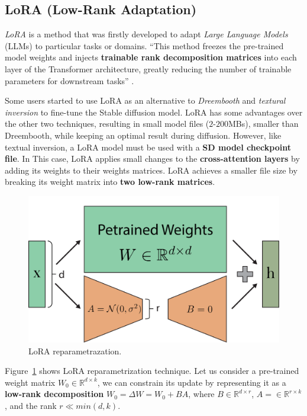\documentclass[preprint]{elsarticle}
\begin{document}
\subsection{LoRA (Low-Rank Adaptation)}

\emph{LoRA} \cite{hu2021lora} is a method that was firstly developed to adapt 
\emph{Large Language Models} (LLMs) to particular tasks or domains.
``This method freezes  the pre-trained model weights and injects \textbf{trainable rank decomposition matrices}  into each layer of the Transformer architecture, greatly reducing the number of trainable 
parameters for downstream tasks'' \cite{hu2021lora}.

Some users started to use LoRA as an alternative to \emph{Dreembooth} \cite{ruiz2022dreambooth} and \emph{textural inversion} \cite{gal2022image} to  fine-tune the Stable diffusion model. LoRA has some advantages over the other two techniques, resulting in small model files ($2$-$200$MBs), smaller than Dreembooth,  while keeping an optimal result during diffusion. However, like textual inversion, a LoRA model must be used with a \textbf{SD model checkpoint file}. In This case, LoRA applies small changes to the \textbf{cross-attention layers} by adding its  weights to their weights matrices. LoRA achieves a smaller file size by breaking its weight matrix into \textbf{two low-rank matrices}.


\begin{figure}[t]
	\centering
    \includegraphics[scale=0.62]{img/svg/LoRA.png}
	\caption{LoRA reparametrazation.}\label{fig:lora}
\end{figure}


Figure~\ref{fig:lora} shows LoRA reparametrization technique. Let us consider a  pre-trained weight matrix $W_0 \in \mathbb{R}^{d\times k}$, we can constrain its update by representing it as a \textbf{low-rank decomposition} $W_0 = \Delta W=W_0+BA$, where $B \in \mathbb{R}^{d \times r}$, $A= \in \mathbb{R}^{r \times k}$, and the rank $r \ll min(d,k)$.
\end{document}
